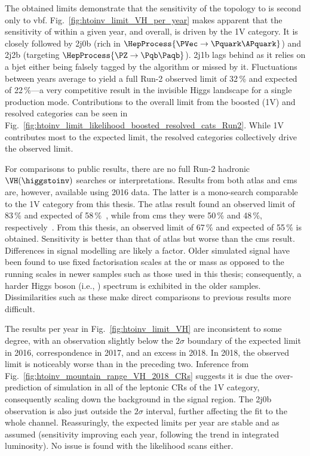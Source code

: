 The obtained limits demonstrate that the sensitivity of the \VH topology to \higgstoinv is second only to \acrshort{vbf}. Fig.~\ref{fig:htoinv_limit_VH_per_year} makes apparent that the sensitivity of \VH within a given year, and overall, is driven by the 1V category. It is closely followed by 2j0b (rich in $\HepProcess{\PVec \to \Pquark\APquark}$) and 2j2b (targeting $\HepProcess{\PZ \to \Pqb\Paqb}$). 2j1b lags behind as it relies on a \gls{bjet} either being falsely tagged by the \deepcsv algorithm or missed by it. Fluctuations between years average to yield a full Run-2 observed limit of 32\,\% and expected of 22\,\%---a very competitive result in the invisible Higgs landscape for a single production mode. Contributions to the overall limit from the boosted (1V) and resolved categories can be seen in Fig.~\ref{fig:htoinv_limit_likelihood_boosted_resolved_cats_Run2}. While 1V contributes most to the expected limit, the resolved categories collectively drive the observed limit.

For comparisons to public results, there are no full Run-2 hadronic $\VH(\higgstoinv)$ searches or interpretations. Results from both \acrshort{atlas} and \acrshort{cms} are, however, available using 2016 data. The latter is a mono-\PVec search comparable to the 1V category from this thesis. The \acrshort{atlas} \VH result found an observed limit of 83\,\% and expected of 58\,\%~\cite{Aaboud:2018xdl}, while from \acrshort{cms} they were 50\,\% and 48\,\%, respectively~\cite{Sirunyan:2017jix}. From this thesis, an observed limit of 67\,\% and expected of 55\,\% is obtained. Sensitivity is better than that of \acrshort{atlas} but worse than the \acrshort{cms} result. Differences in signal modelling are likely a factor. Older simulated signal have been found to use fixed factorisation scales at the \PW or \PH mass as opposed to the running scales in newer samples such as those used in this thesis; consequently, a harder Higgs boson \pt (i.e., \ptmiss) spectrum is exhibited in the older samples. Dissimilarities such as these make direct comparisons to previous results more difficult.


The results per year in Fig.~\ref{fig:htoinv_limit_VH} are inconsistent to some degree, with an observation slightly below the $\text{2}\sigma$ boundary of the expected limit in 2016, correspondence in 2017, and an excess in 2018. In 2018, the observed limit is noticeably worse than in the preceding two. Inference from Fig.~\ref{fig:htoinv_mountain_range_VH_2018_CRs} suggests it is due the over-prediction of simulation in all of the leptonic \glspl{CR} of the 1V category, consequently scaling down the background in the signal region. The 2j0b observation is also just outside the $\text{2}\sigma$ interval, further affecting the fit to the whole channel. Reassuringly, the expected limits per year are stable and as assumed (sensitivity improving each year, following the trend in integrated luminosity). No issue is found with the likelihood scans either.

